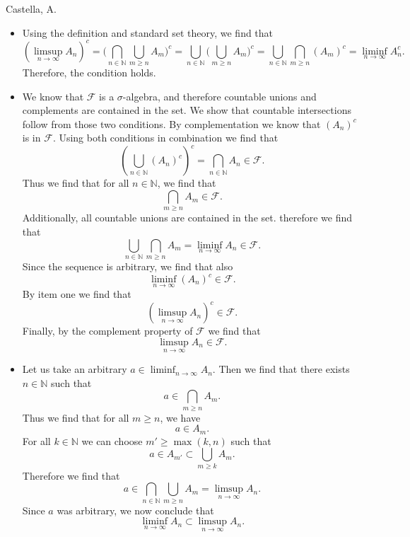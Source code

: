 \begin{solution}[2.3]{Castella, A.}
    \begin{itemize}
        \item Using the definition and standard set theory, we find that
        $$
            (\limsup_{n\rightarrow\infty}A_n)^c = \Big(\bigcap_{n\in\mathbb{N}}\bigcup_{m\geq n}A_m\Big)^c = \bigcup_{n\in\mathbb{N}}\Big(\bigcup_{m\geq n}A_m\Big)^c = \bigcup_{n\in\mathbb{N}}\bigcap_{m\geq n}(A_m)^c = \liminf_{n\rightarrow\infty}A_n^c.
        $$
        Therefore, the condition holds.
        \item We know that $\mathcal{F}$ is a $\sigma$-algebra, and therefore countable unions and complements are contained in the set. We show that countable intersections follow from those two conditions. By complementation we know that $(A_n)^c$ is in $\mathcal{F}$. Using both conditions in combination we find that
        $$
            \left(\bigcup_{n\in\mathbb{N}}(A_n)^c\right)^c = \bigcap_{n\in\mathbb{N}}A_n \in \mathcal{F}.
        $$
        Thus we find that for all $n \in \mathbb{N}$, we find that
        $$
            \bigcap_{m\geq n}A_m \in \mathcal{F}.
        $$
        Additionally, all countable unions are contained in the set. therefore we find that
        $$
            \bigcup_{n\in\mathbb{N}}\bigcap_{m\geq n}A_m = \liminf_{n\rightarrow\infty}A_n \in \mathcal{F}.
        $$
        Since the sequence is arbitrary, we find that also 
        $$
            \liminf_{n\rightarrow\infty}(A_n)^c \in \mathcal{F}.
        $$
        By item one we find that
        $$
            (\limsup_{n\rightarrow\infty}A_n)^c \in \mathcal{F}.
        $$
        Finally, by the complement property of $\mathcal{F}$ we find that
        $$
            \limsup_{n\rightarrow\infty}A_n \in \mathcal{F}.
        $$
        \item Let us take an arbitrary $a \in \liminf_{n\rightarrow\infty}A_n$. Then we find that there exists $n \in \mathbb{N}$ such that
        $$
            a\in \bigcap_{m\geq n}A_m.
        $$
        Thus we find that for all $m \geq n$, we have
        $$
            a\in A_m.
        $$
        For all $k \in \mathbb{N}$ we can choose $m' \geq \max(k,n)$ such that
        $$
            a\in A_{m'} \subset \bigcup_{m\geq k}A_m.
        $$
        Therefore we find that
        $$
            a\in \bigcap_{n\in\mathbb{N}}\bigcup_{m\geq n}A_m = \limsup_{n\rightarrow\infty}A_n.
        $$
        Since $a$ was arbitrary, we now conclude that
        $$
            \liminf_{n\rightarrow\infty}A_n \subset \limsup_{n\rightarrow\infty}A_n.
$$
\end{itemize}
\end{solution}
